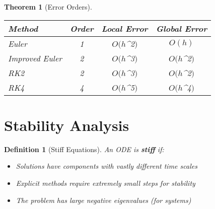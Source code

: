 \documentclass[12pt]{article}
\newtheorem{definition}{Definition}
\newtheorem{theorem}{Theorem}
\begin{document}
\begin{theorem}[Error Orders]
\begin{center}
\begin{tabular}{|l|c|c|c|}
\hline
\textbf{Method} & \textbf{Order} & \textbf{Local Error} & \textbf{Global Error} \\
\hline
Euler & 1 & $O(h$^{2}$)$ & $O(h)$ \\
Improved Euler & 2 & $O(h$^{3}$)$ & $O(h$^{2}$)$ \\
RK2 & 2 & $O(h$^{3}$)$ & $O(h$^{2}$)$ \\
RK4 & 4 & $O(h$^{5}$)$ & $O(h$^{4}$)$ \\
\hline
\end{tabular}
\end{center}
\end{theorem}

\section{Stability Analysis}


\begin{definition}[Stiff Equations]
An ODE is \textbf{stiff} if:
\begin{itemize}
\item Solutions have components with vastly different time scales
\item Explicit methods require extremely small steps for stability
\item The problem has large negative eigenvalues (for systems)
\end{itemize}
\end{definition}

\end{document}
